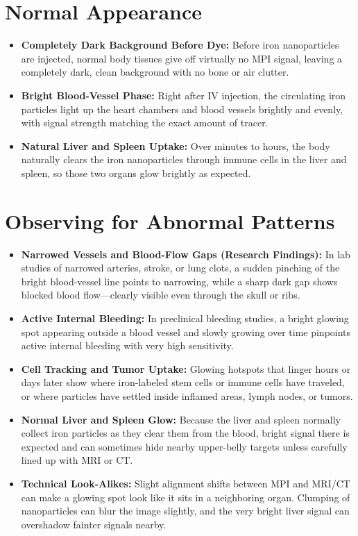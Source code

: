 \section{Normal Appearance}

\begin{itemize}
    \item \textbf{Completely Dark Background Before Dye:} Before iron nanoparticles are injected, normal body tissues give off virtually no MPI signal, leaving a completely dark, clean background with no bone or air clutter.
    \item \textbf{Bright Blood-Vessel Phase:} Right after IV injection, the circulating iron particles light up the heart chambers and blood vessels brightly and evenly, with signal strength matching the exact amount of tracer.
    \item \textbf{Natural Liver and Spleen Uptake:} Over minutes to hours, the body naturally clears the iron nanoparticles through immune cells in the liver and spleen, so those two organs glow brightly as expected.
\end{itemize}

\section{Observing for Abnormal Patterns}

\begin{itemize}
    \item \textbf{Narrowed Vessels and Blood-Flow Gaps (Research Findings):} In lab studies of narrowed arteries, stroke, or lung clots, a sudden pinching of the bright blood-vessel line points to narrowing, while a sharp dark gap shows blocked blood flow---clearly visible even through the skull or ribs.
    \item \textbf{Active Internal Bleeding:} In preclinical bleeding studies, a bright glowing spot appearing outside a blood vessel and slowly growing over time pinpoints active internal bleeding with very high sensitivity.
    \item \textbf{Cell Tracking and Tumor Uptake:} Glowing hotspots that linger hours or days later show where iron-labeled stem cells or immune cells have traveled, or where particles have settled inside inflamed areas, lymph nodes, or tumors.
    \item \textbf{Normal Liver and Spleen Glow:} Because the liver and spleen normally collect iron particles as they clear them from the blood, bright signal there is expected and can sometimes hide nearby upper-belly targets unless carefully lined up with MRI or CT.
    \item \textbf{Technical Look-Alikes:} Slight alignment shifts between MPI and MRI/CT can make a glowing spot look like it sits in a neighboring organ. Clumping of nanoparticles can blur the image slightly, and the very bright liver signal can overshadow fainter signals nearby.
\end{itemize}

